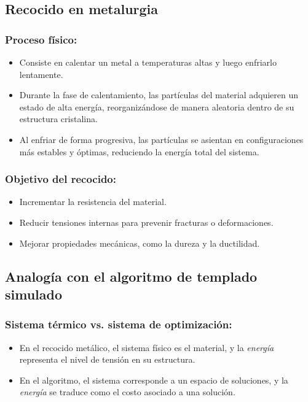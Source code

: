 \documentclass{article}
\begin{document}
\subsection{Recocido en metalurgia}

\subsubsection{Proceso físico:}
\begin{itemize}
    \item Consiste en calentar un metal a temperaturas altas y luego enfriarlo lentamente.
    \item Durante la fase de calentamiento, las partículas del material adquieren un estado de alta energía, reorganizándose de manera aleatoria dentro de su estructura cristalina.
    \item Al enfriar de forma progresiva, las partículas se asientan en configuraciones más estables y óptimas, reduciendo la energía total del sistema.
\end{itemize}

\subsubsection{Objetivo del recocido:}
\begin{itemize}
    \item Incrementar la resistencia del material.
    \item Reducir tensiones internas para prevenir fracturas o deformaciones.
    \item Mejorar propiedades mecánicas, como la dureza y la ductilidad.
\end{itemize}

\subsection{Analogía con el algoritmo de templado simulado}

\subsubsection{Sistema térmico vs. sistema de optimización:}
\begin{itemize}
    \item En el recocido metálico, el sistema físico es el material, y la \textit{energía} representa el nivel de tensión en su estructura.
    \item En el algoritmo, el sistema corresponde a un espacio de soluciones, y la \textit{energía} se traduce como el costo asociado a una solución.
\end{itemize}
\end{document}
